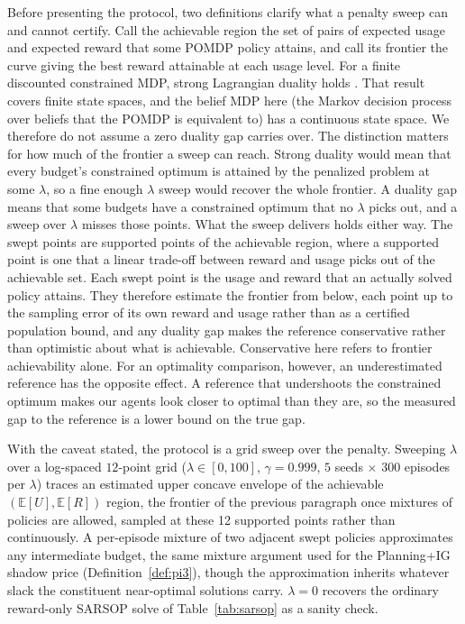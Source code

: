 Before presenting the protocol, two definitions clarify what a penalty sweep can and cannot certify. Call the achievable region the set of pairs of expected usage and expected reward that some POMDP policy attains, and call its frontier the curve giving the best reward attainable at each usage level. For a finite discounted constrained MDP, strong Lagrangian duality holds \citep{altman1999}. That result covers finite state spaces, and the belief MDP here (the Markov decision process over beliefs that the POMDP is equivalent to) has a continuous state space. We therefore do not assume a zero duality gap carries over. The distinction matters for how much of the frontier a sweep can reach. Strong duality would mean that every budget's constrained optimum is attained by the penalized problem at some $\lambda$, so a fine enough $\lambda$ sweep would recover the whole frontier. A duality gap means that some budgets have a constrained optimum that no $\lambda$ picks out, and a sweep over $\lambda$ misses those points. What the sweep delivers holds either way. The swept points are supported points of the achievable region, where a supported point is one that a linear trade-off between reward and usage picks out of the achievable set. Each swept point is the usage and reward that an actually solved policy attains. They therefore estimate the frontier from below, each point up to the sampling error of its own reward and usage rather than as a certified population bound, and any duality gap makes the reference conservative rather than optimistic about what is achievable. Conservative here refers to frontier achievability alone. For an optimality comparison, however, an underestimated reference has the opposite effect. A reference that undershoots the constrained optimum makes our agents look closer to optimal than they are, so the measured gap to the reference is a lower bound on the true gap.

With the caveat stated, the protocol is a grid sweep over the penalty. Sweeping $\lambda$ over a log-spaced $12$-point grid ($\lambda \in [0, 100]$, $\gamma{=}0.999$, $5$ seeds $\times$ $300$ episodes per $\lambda$) traces an estimated upper concave envelope of the achievable $(\mathbb{E}[U], \mathbb{E}[R])$ region, the frontier of the previous paragraph once mixtures of policies are allowed, sampled at these 12 supported points rather than continuously. A per-episode mixture of two adjacent swept policies approximates any intermediate budget, the same mixture argument used for the Planning+IG shadow price (Definition~\ref{def:pi3}), though the approximation inherits whatever slack the constituent near-optimal solutions carry. $\lambda{=}0$ recovers the ordinary reward-only SARSOP solve of Table~\ref{tab:sarsop} as a sanity check.

